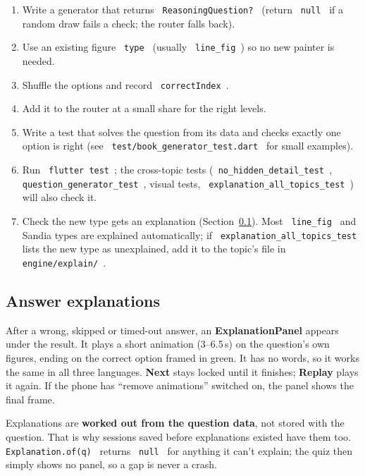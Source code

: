 \documentclass[12pt,a4paper]{article}
\newcommand{\codebs}{\symbol{92}\penalty50\relax}
\newcommand{\code}[1]{\texttt{\let\textbackslash\codebs\XeTeXinterchartokenstate=1 #1\XeTeXinterchartokenstate=0 }}
\begin{document}
\begin{enumerate}
\item Write a generator that returns \code{ReasoningQuestion?} (return \code{null} if a random draw fails a check; the router falls back).
\item Use an existing figure \code{type} (usually \code{line_fig}) so no new painter is needed.
\item Shuffle the options and record \code{correctIndex}.
\item Add it to the router at a small share for the right levels.
\item Write a test that solves the question from its data and checks exactly one option is right (see \code{test/book_generator_test.dart} for small examples).
\item Run \code{flutter test}; the cross-topic tests (\code{no_hidden_detail_test}, \code{question_generator_test}, visual tests, \code{explanation_all_topics_test}) will also check it.
\item Check the new type gets an explanation (Section~\ref{sec:explanations}). Most \code{line_fig} and Sandia types are explained automatically; if \code{explanation_all_topics_test} lists the new type as unexplained, add it to the topic's file in \code{engine/explain/}.
\end{enumerate}

\subsection{Answer explanations}\label{sec:explanations}

After a wrong, skipped or timed-out answer, an \textbf{ExplanationPanel} appears under the result. It plays a short animation (3--6.5\,s) on the question's own figures, ending on the correct option framed in green. It has no words, so it works the same in all three languages. \textbf{Next} stays locked until it finishes; \textbf{Replay} plays it again. If the phone has ``remove animations'' switched on, the panel shows the final frame.

Explanations are \textbf{worked out from the question data}, not stored with the question. That is why sessions saved before explanations existed have them too. \code{Explanation.of(q)} returns \code{null} for anything it can't explain; the quiz then simply shows no panel, so a gap is never a crash.
\end{document}
